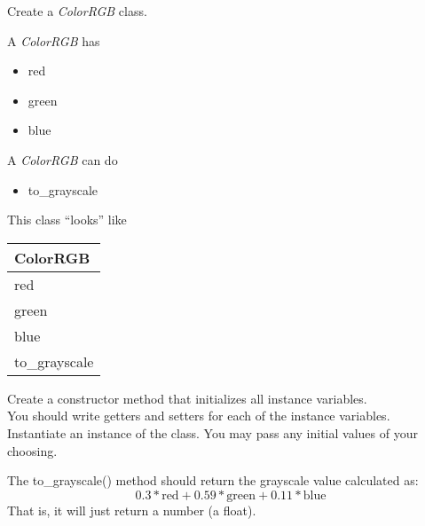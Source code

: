 	\item Create a \textit{ColorRGB} class.\\
	\begin{minipage}{.6\textwidth}		
		A \textit{ColorRGB} has
		\begin{itemize}
			\item red 
			\item green
			\item blue
		\end{itemize}

		A \textit{ColorRGB} can do
		\begin{itemize}
			\item to\_grayscale
		\end{itemize}
	\end{minipage}
	\begin{minipage}{.4\textwidth}
		This class ``looks'' like 
				
		\vspace*{1em}
		\begin{tabular}{|l|}
			\hline ColorRGB\\ \hline
			red\\ green\\ blue\\ \hline
			to\_grayscale\\  \hline
		\end{tabular}
	\end{minipage}

	\vspace*{2ex}
	Create a constructor method that initializes all instance variables.\\
	You should write getters and setters for each of the instance variables.\\
	Instantiate an instance of the class. You may pass any initial values of your choosing.

	The to\_grayscale() method should return the grayscale value calculated as: 
		$$0.3 * \text{red} + 0.59 * \text{green} + 0.11 * \text{blue}$$
	That is, it will just return a number (a float).




